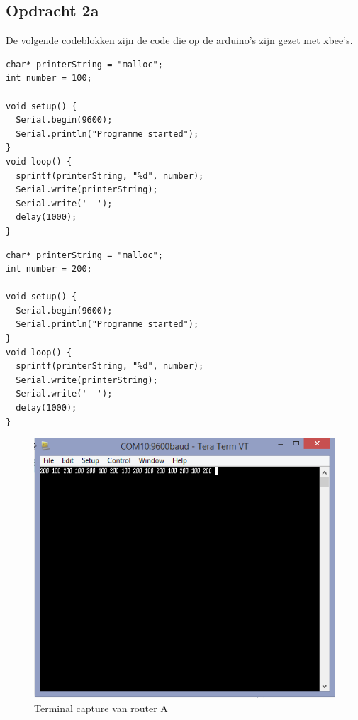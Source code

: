 \documentclass[12pt]{article}
\begin{document}
\subsection{Opdracht 2a}
De volgende codeblokken zijn de code die op de arduino's zijn gezet met xbee's.
\begin{lstlisting}
char* printerString = "malloc";
int number = 100;

void setup() {
  Serial.begin(9600);
  Serial.println("Programme started");
}
void loop() {
  sprintf(printerString, "%d", number);
  Serial.write(printerString);
  Serial.write('  ');
  delay(1000);
}
\end{lstlisting}
\begin{lstlisting}
char* printerString = "malloc";
int number = 200;

void setup() {
  Serial.begin(9600);
  Serial.println("Programme started");
}
void loop() {
  sprintf(printerString, "%d", number);
  Serial.write(printerString);
  Serial.write('  ');
  delay(1000);
}
\end{lstlisting}
\begin{center}
\begin{figure}[h]
\includegraphics[scale=0.7]{100-200.jpg}
\caption{Terminal capture van router A}
\label{fig:output7}
\end{figure}   
\end{center}
\newpage
\end{document}
